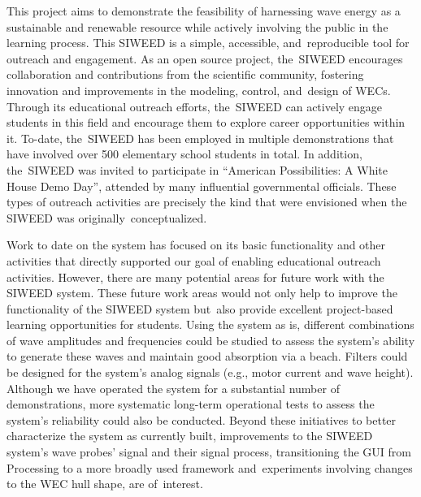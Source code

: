 \documentclass[hardware,article,submit,pdftex,moreauthors]{Definitions/mdpi}
\begin{document}
This project aims to demonstrate the feasibility of harnessing wave energy as a sustainable and renewable resource while actively involving the public in the learning process.
This SIWEED is a simple, accessible, and~reproducible tool for outreach and engagement.
As an open source project, the~SIWEED encourages collaboration and contributions from the scientific community, fostering innovation and improvements in the modeling, control, and~design of WECs.
Through its educational outreach efforts, the~SIWEED can actively engage students in this field and encourage them to explore career opportunities within it.
To-date, the~SIWEED has been employed in multiple demonstrations that have involved over 500 elementary school students in total.
In addition, the~SIWEED was invited to participate in ``American Possibilities: A White House Demo Day'', attended by many influential governmental officials.
These types of outreach activities are precisely the kind that were envisioned when the SIWEED was originally~conceptualized.

Work to date on the system has focused on its basic functionality and other activities that directly supported our goal of enabling educational outreach activities.
However, there are many potential areas for future work with the SIWEED system.
These future work areas would not only help to improve the functionality of the SIWEED system but~also provide excellent project-based learning opportunities for students.
Using the system as is, different combinations of wave amplitudes and frequencies could be studied to assess the system's ability to generate these waves and maintain good absorption via a beach.
Filters could be designed for the system's analog signals (e.g., motor current and wave height).
Although we have operated the system for a substantial number of demonstrations, more systematic long-term operational tests to assess the system's reliability could also be conducted.
Beyond these initiatives to better characterize the system as currently built, improvements to the SIWEED system's wave probes' signal and their signal process, transitioning the GUI from Processing to a more broadly used framework and~experiments involving changes to the WEC hull shape, are of~interest.

\vspace{6pt}
\end{document}
